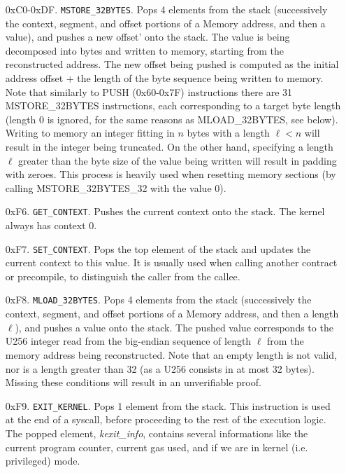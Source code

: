 \begin{enumerate}[align=left]
  \item[0xC0-0xDF.] \texttt{MSTORE\_32BYTES}. Pops 4 elements from the stack (successively the context, segment, and offset portions of a Memory address, and then a value), and pushes
  a new offset' onto the stack. The value is being decomposed into bytes and written to memory, starting from the reconstructed address. The new offset being pushed is computed as the
  initial address offset + the length of the byte sequence being written to memory. Note that similarly to PUSH (0x60-0x7F) instructions there are 31 MSTORE\_32BYTES instructions, each
  corresponding to a target byte length (length 0 is ignored, for the same reasons as MLOAD\_32BYTES, see below). Writing to memory an integer fitting in $n$ bytes with a length $\ell < n$ will
  result in the integer being truncated. On the other hand, specifying a length $\ell$ greater than the byte size of the value being written will result in padding with zeroes. This
  process is heavily used when resetting memory sections (by calling MSTORE\_32BYTES\_32 with the value 0).

  \item[0xF6.] \texttt{GET\_CONTEXT}. Pushes the current context onto the stack. The kernel always has context 0.

  \item[0xF7.] \texttt{SET\_CONTEXT}. Pops the top element of the stack and updates the current context to this value. It is usually used when calling another contract or precompile,
  to distinguish the caller from the callee.

  \item[0xF8.] \texttt{MLOAD\_32BYTES}. Pops 4 elements from the stack (successively the context, segment, and offset portions of a Memory address, and then a length $\ell$), and pushes
  a value onto the stack. The pushed value corresponds to the U256 integer read from the big-endian sequence of length $\ell$ from the memory address being reconstructed. Note that an
  empty length is not valid, nor is a length greater than 32 (as a U256 consists in at most 32 bytes). Missing these conditions will result in an unverifiable proof.

  \item[0xF9.] \texttt{EXIT\_KERNEL}. Pops 1 element from the stack. This instruction is used at the end of a syscall, before proceeding to the rest of the execution logic.
  The popped element, \textit{kexit\_info}, contains several informations like the current program counter, current gas used, and if we are in kernel (i.e. privileged) mode.


\end{enumerate}
